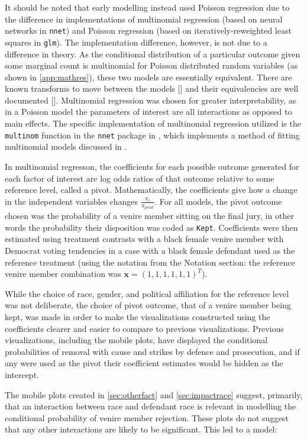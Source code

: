 It should be noted that early modelling instead used Poisson regression due to the difference in implementations of multinomial
regression (based on neural networks in \texttt{nnet}) and Poisson regression (based on iteratively-reweighted least squares in
\texttt{glm}). The implementation difference, however, is not due to a difference in theory. As the conditional distribution of a
particular outcome given some marginal count is multinomial for
Poisson distributed random variables (as shown in \ref{app:mathres}), these two models are essentially
equivalent. There are known transforms to move between the models [\cite{baker1994}] and their equivalencies are well documented
[\cite{lang1996}]. Multinomial regression was chosen for greater interpretability, as in a Poisson model the parameters of
interest are all interactions as opposed to main effects. The specific implementation of multinomial regression utilized is the
\texttt{multinom} function in the \texttt{nnet} package in \Rp, which implements a method of fitting multinomial models discussed
in \cite{nnet}.

In multinomial regresson, the coefficients for each possible outcome generated for each factor of interest are log odds ratios of
that outcome relative to some reference level, called a pivot. Mathematically, the coefficients give how a change in the
independent variables changes $\frac{\pi_i}{\pi_{pivot}}$. For all models, the pivot outcome chosen was the probability of a
venire member sitting on the final jury, in other words the probability their disposition was coded as \texttt{Kept}. Coefficients were
then estimated using treatment contrasts with a black female venire member with Democrat voting tendencies in a case with a black female
defendant used as the reference treatment (using the notation from the
Notation section: the reference venire member combination was
$\mathbf{x} = (1,1,1,1,1,1)^T$).

While the choice of race, gender, and political affiliation for the reference level was not deliberate, the choice of pivot
outcome, that of a venire member being kept, was made in order to make the visualizations constructed using the coefficients
clearer and easier to compare to previous visualizations. Previous visualizations, including the mobile plots, have displayed the
conditional probabilities of removal with cause and strikes by defence and prosecution, and if any were used as the pivot their
coefficient estimates would be hidden as the intercept.

The mobile plots created in \ref{sec:otherfact} and \ref{sec:impactrace} suggest, primarily, that an interaction between race and
defendant race is relevant in modelling the conditional probability of venire member rejection. These plots do not suggest that
any other interactions are likely to be significant. This led to a model:

